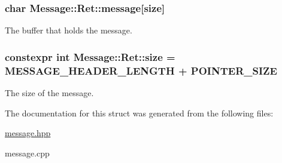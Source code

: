 \subsubsection[{\texorpdfstring{message}{message}}]{\setlength{\rightskip}{0pt plus 5cm}char Message\+::\+Ret\+::message\mbox{[}{\bf size}\mbox{]}}\hypertarget{struct_message_1_1_ret_ad2ec4cd89746f6199effe93fffa1d5fc}{}\label{struct_message_1_1_ret_ad2ec4cd89746f6199effe93fffa1d5fc}


The buffer that holds the message. 

\subsubsection[{\texorpdfstring{size}{size}}]{\setlength{\rightskip}{0pt plus 5cm}constexpr int Message\+::\+Ret\+::size = {\bf M\+E\+S\+S\+A\+G\+E\+\_\+\+H\+E\+A\+D\+E\+R\+\_\+\+L\+E\+N\+G\+TH} + {\bf P\+O\+I\+N\+T\+E\+R\+\_\+\+S\+I\+ZE}\hspace{0.3cm}{\ttfamily [static]}}\hypertarget{struct_message_1_1_ret_a4252f158b2b8db8901e796e51d4a99c9}{}\label{struct_message_1_1_ret_a4252f158b2b8db8901e796e51d4a99c9}


The size of the message. 



The documentation for this struct was generated from the following files\+:\begin{DoxyCompactItemize}
\item 
\hyperlink{message_8hpp}{message.\+hpp}\item 
message.\+cpp\end{DoxyCompactItemize}
